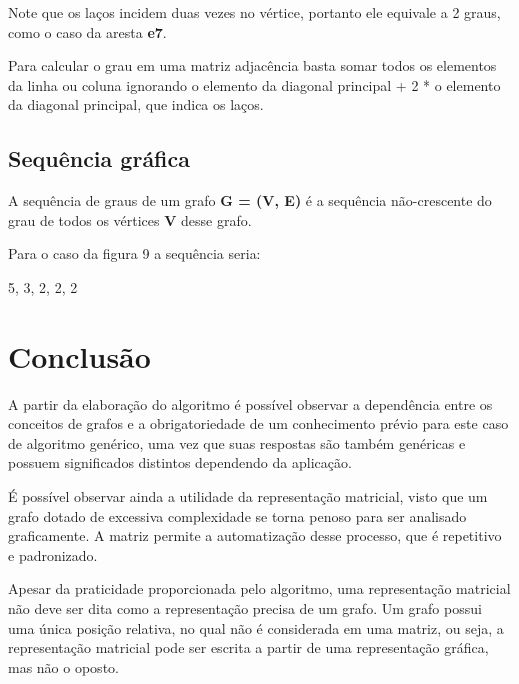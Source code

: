 \documentclass[a4paper, 12pt]{article}
\begin{document}
    Note que os laços incidem duas vezes no vértice, portanto ele equivale a 2 graus, como o caso da aresta \textbf{e7}.
    
    \indent Para calcular o grau em uma matriz adjacência basta somar todos os elementos da linha ou coluna ignorando o elemento da diagonal principal + 2 * o elemento da diagonal principal, que indica os laços.
    
\subsection{Sequência gráfica}

    A sequência de graus de um grafo \textbf{G = (V, E)} é a sequência não-crescente do grau de todos os vértices \textbf{V} desse grafo. 
    
    \indent Para o caso da figura 9 a sequência seria:
    
    \begin{center}
     5, 3, 2, 2, 2
    \end{center}


\section{Conclusão}

    A partir da elaboração do algoritmo é possível observar a dependência entre os conceitos de grafos e a obrigatoriedade de um conhecimento prévio para este caso de algoritmo genérico, uma vez que suas respostas são também genéricas e possuem significados distintos dependendo da aplicação. 
    
    \indent É possível observar ainda a utilidade da representação matricial, visto que um grafo dotado de excessiva complexidade se torna penoso para ser analisado graficamente. A matriz permite a automatização desse processo, que é repetitivo e padronizado.
    
    \indent Apesar da praticidade proporcionada pelo algoritmo, uma representação matricial não deve ser dita como a representação precisa de um grafo. Um grafo possui uma única posição relativa, no qual não é considerada em uma matriz, ou seja, a representação matricial pode ser escrita a partir de uma representação gráfica, mas não o oposto.
\end{document}
